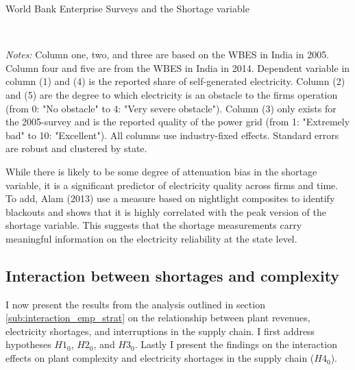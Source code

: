 \documentclass[11pt]{article}
\begin{document}
\begin{table}
    \caption{World Bank Enterprise Surveys and the Shortage variable}
    \label{tab:wbes}
    \begin{minipage}{0.95\textwidth} 

    \\
    { \footnotesize \textit{Notes:} Column one, two, and three are based on the WBES in India in 2005. Column four and five are from the WBES in India in 2014. Dependent variable in column (1) and (4) is the reported share of self-generated electricity. Column (2) and (5) are the degree to which electricity is an obstacle to the firms operation (from 0: "No obstacle" to 4: "Very severe obstacle"). Column (3) only exists for the 2005-survey and is the reported quality of the power grid (from 1: "Extremely bad" to 10: "Excellent"). All columns use industry-fixed effects. Standard errors are robust and clustered by state. \\
\par}
    \end{minipage}
\end{table}   

While there is likely to be some degree of attenuation bias in the shortage variable, it is a significant predictor of electricity quality across firms and time. To add, Alam (2013) use a measure based on nightlight composites to identify blackouts and shows that it is highly correlated with the peak version of the shortage variable. This suggests that the shortage measurements carry meaningful information on the electricity reliability at the state level.

\subsection{Interaction between shortages and complexity}%
\label{sub:regressions}

I now present the results from the analysis outlined in section \ref{sub:interaction_emp_strat} on the relationship between plant revenues, electricity shortages, and interruptions in the supply chain. I first address hypotheses $H1_0$, $H2_0$, and $H3_0$. Lastly I present the findings on the interaction effects on plant complexity and electricity shortages in the supply chain ($H4_0$).
\end{document}
